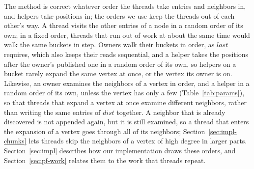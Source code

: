 The method is correct whatever order the threads take entries and neighbors in, and helpers take positions in; the orders we use keep the threads out of each other's way. A thread visits the other entries of a node in a random order of its own; in a fixed order, threads that run out of work at about the same time would walk the same buckets in step. Owners walk their buckets in order, as $\mathit{last}$ requires, which also keeps their reads sequential, and a helper takes the positions after the owner's published one in a random order of its own, so helpers on a bucket rarely expand the same vertex at once, or the vertex its owner is on. Likewise, an owner examines the neighbors of a vertex in order, and a helper in a random order of its own, unless the vertex has only a few (Table~\ref{tab:params}), so that threads that expand a vertex at once examine different neighbors, rather than writing the same entries of $\mathit{dist}$ together. A neighbor that is already discovered is not appended again, but it is still examined, so a thread that enters the expansion of a vertex goes through all of its neighbors; Section~\ref{sec:impl-chunks} lets threads skip the neighbors of a vertex of high degree in larger parts. Section~\ref{sec:impl} describes how our implementation draws these orders, and Section~\ref{sec:pf-work} relates them to the work that threads repeat.
